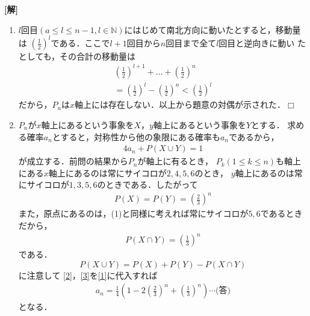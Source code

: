 \documentclass[a4j]{jarticle}
\begin{document}
\setlength{\columnseprule}{0.4pt}
\begin{multicols}{2}
{\bf[解]}
     \begin{enumerate}[(1)]
     \item $l$回目$(a\le l\le n-1,l\in\mathbb{N})$にはじめて南北方向に動いたとすると，移動量は
     $\left(\frac{1}{2}\right)^l$である．ここで$l+1$回目から$n$回目まで全て$l$回目と逆向きに動い
     たとしても，その合計の移動量は
          \begin{align*}
          \left(\frac{1}{2}\right)^{l+1}+ \dots+\left(\frac{1}{2}\right)^n \\
          =\left(\frac{1}{2}\right)^l-\left(\frac{1}{2}\right)^n<\left(\frac{1}{2}\right)^l
          \end{align*}
     だから，$P_n$は$x$軸上には存在しない．以上から題意の対偶が示された．$\Box$
     \item $P_n$が$x$軸上にあるという事象を$X$，$y$軸上にあるという事象を$Y$とする．
     求める確率$a_n$とすると，対称性から他の象限にある確率も$a_n$であるから，
          \begin{align}
          4a_n+P(X\cup Y)=1 \label{1}
          \end{align}
     が成立する．前問の結果から$P_n$が軸上に有るとき，
     $P_k(1\le k\le n)$も軸上にある$x$軸上にあるのは常にサイコロが$2,4,5,6$のとき，
     $y$軸上にあるのは常にサイコロが$1,3,5,6$のときである．したがって
          \begin{align}
           P(X)=P(Y)=\left(\frac{2}{3}\right)^n  \label{2}    
          \end{align}
     また，原点にあるのは，(1)と同様に考えれば常にサイコロが$5,6$であるときだから，
          \begin{align}
          P(X\cap Y)=\left(\frac{1}{3}\right)^n \label{3}
          \end{align}
     である．
          \[P(X\cup Y)=P(X)+P(Y)-P(X\cap Y) \]
     に注意して     
     \eqref{2}，\eqref{3}を\eqref{1}に代入すれば
          \begin{align*}
          a_n=\frac{1}{4}\left(1-2\left(\frac{2}{3}\right)^n+\left(\frac{1}{3}\right)^n\right)\cdots\text{(答)}
          \end{align*}
     となる．     
     \end{enumerate}
\newpage
\end{multicols}
\end{document}
